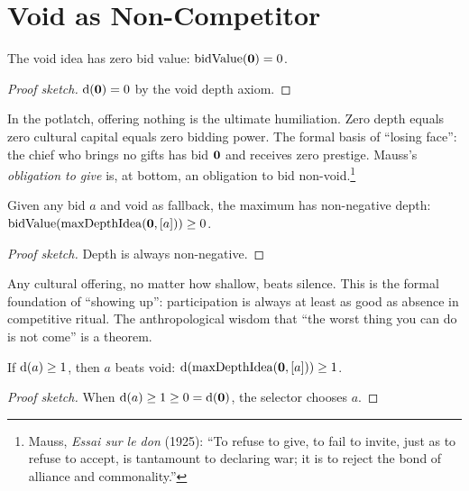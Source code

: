 \section{Void as Non-Competitor}
\label{sec:ch14-void}

\begin{theorem}
\label{thm:void-bid}
The void idea has zero bid value: $\operatorname{bidValue}(\mathbf{0}) = 0$.
\end{theorem}

\begin{proof}[Proof sketch]
$\operatorname{d}(\mathbf{0}) = 0$ by the void depth axiom.
\end{proof}

In the potlatch, offering nothing is the ultimate humiliation.  Zero depth
equals zero cultural capital equals zero bidding power.  The formal basis of
``losing face'': the chief who brings no gifts has bid $\mathbf{0}$ and receives
zero prestige.  Mauss's \emph{obligation to give} is, at bottom, an
obligation to bid non-void.\footnote{Mauss, \textit{Essai sur le don}
(1925): ``To refuse to give, to fail to invite, just as to refuse to
accept, is tantamount to declaring war; it is to reject the bond of
alliance and commonality.''}

\begin{theorem}
\label{thm:void-loses}
Given any bid $a$ and void as fallback, the maximum has non-negative depth:
$\operatorname{bidValue}(\operatorname{maxDepthIdea}(\mathbf{0}, [a])) \ge 0$.
\end{theorem}

\begin{proof}[Proof sketch]
Depth is always non-negative.
\end{proof}

Any cultural offering, no matter how shallow, beats silence.  This is the
formal foundation of ``showing up'': participation is always at least as
good as absence in competitive ritual.  The anthropological wisdom that
``the worst thing you can do is not come'' is a theorem.

\begin{theorem}
\label{thm:deeper-void}
If $\operatorname{d}(a) \ge 1$, then $a$ beats void:
$\operatorname{d}(\operatorname{maxDepthIdea}(\mathbf{0}, [a])) \ge 1$.
\end{theorem}

\begin{proof}[Proof sketch]
When $\operatorname{d}(a) \ge 1 \ge 0 = \operatorname{d}(\mathbf{0})$, the selector chooses $a$.
\end{proof}

